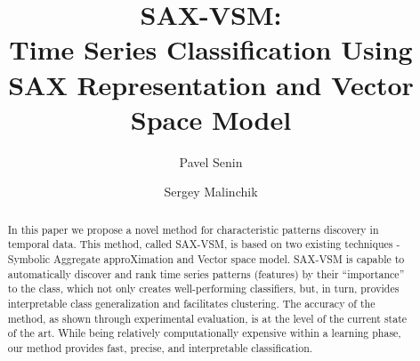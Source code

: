 \documentclass{llncs}
\begin{document}
%
\mainmatter              %
%
\title{SAX-VSM: \\Time Series Classification Using SAX Representation and Vector Space Model}
%
%
\author{Pavel Senin
\and Sergey Malinchik
}
%
%
%


\maketitle              %

\begin{abstract}
In this paper we propose a novel method for characteristic patterns discovery in 
temporal data. This method, called SAX-VSM, is based on two existing techniques - 
Symbolic Aggregate approXimation and Vector space model. SAX-VSM is capable 
to automatically discover and rank time series patterns (features) by their 
“importance” to the class, which not only creates well-performing classifiers, 
but, in turn, provides interpretable class generalization and facilitates clustering. 
The accuracy of the method, as shown through experimental evaluation, is at the 
level of the current state of the art. 
While being relatively computationally expensive within a learning phase, 
our method provides fast, precise, and interpretable classification.
\end{abstract}
%
\end{document}
